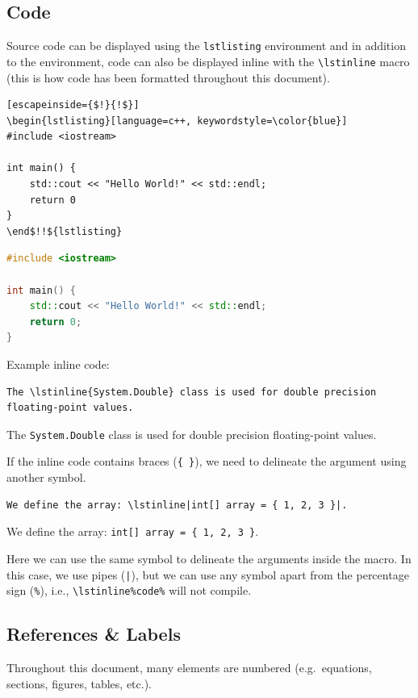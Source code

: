 \documentclass[11pt, twoside]{article}
\begin{document}
\subsection{Code}
Source code can be displayed using the \lstinline{lstlisting} environment and in addition to the environment,
code can also be displayed inline with the \lstinline{\lstinline} macro (this is how code has been formatted throughout this document).
\begin{lstlisting}[escapeinside={$!}{!$}]
\begin{lstlisting}[language=c++, keywordstyle=\color{blue}]
#include <iostream>

int main() {
    std::cout << "Hello World!" << std::endl;
    return 0
}
\end$!!${lstlisting}
\end{lstlisting}
\begin{outputbox}
    \begin{lstlisting}[language=c++,keywordstyle=\color{blue}]
#include <iostream>

int main() {
    std::cout << "Hello World!" << std::endl;
    return 0;
}
\end{lstlisting}
\end{outputbox}
Example inline code:
\begin{lstlisting}
The \lstinline{System.Double} class is used for double precision floating-point values.
\end{lstlisting}
\begin{outputbox}
    The \lstinline{System.Double} class is used for double precision floating-point values.
\end{outputbox}
If the inline code contains braces (\lstinline|{ }|), we need to delineate the argument using another symbol.
\begin{lstlisting}
We define the array: \lstinline|int[] array = { 1, 2, 3 }|.
\end{lstlisting}
\begin{outputbox}
    We define the array: \lstinline|int[] array = { 1, 2, 3 }|.
\end{outputbox}
Here we can use the same symbol to delineate the arguments inside the macro. In this case, we use pipes (\lstinline{|}), but we can use any symbol apart from the percentage sign (\lstinline{%}), i.e., \lstinline|\lstinline%code%| will not compile.
\subsection{References \& Labels}
Throughout this document, many elements are numbered (e.g.\ equations, sections, figures, tables, etc.).
\end{document}
